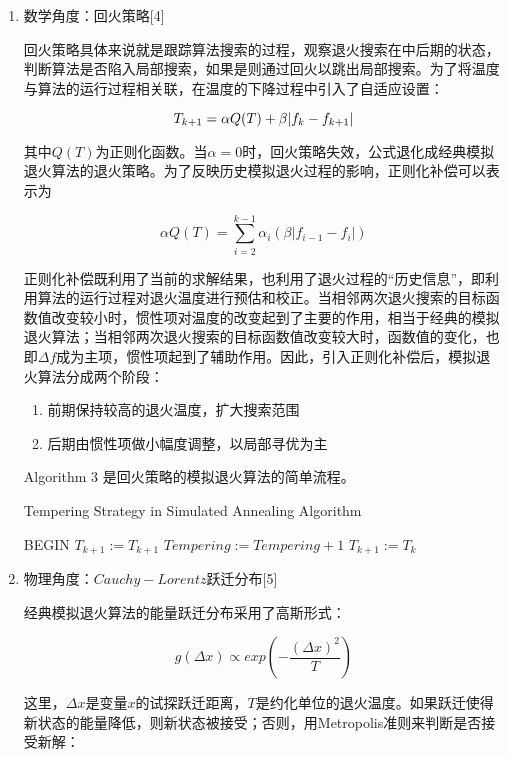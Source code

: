 \documentclass[UTF8]{ctexart}
\begin{document}
\begin{enumerate}
	\def\labelenumi{\arabic{enumi}.}
	\item
	数学角度：回火策略[4]
	
	回火策略具体来说就是跟踪算法搜索的过程，观察退火搜索在中后期的状态，判断算法是否陷入局部搜索，如果是则通过回火以跳出局部搜索。为了将温度与算法的运行过程相关联，在温度的下降过程中引入了自适应设置：
	
	\[T_{k+1}=\alpha Q(T)+\beta |f_k-f_{k+1}| \\\]
	
	其中\(Q(T)\)为正则化函数。当\(\alpha =0\)时，回火策略失效，公式退化成经典模拟退火算法的退火策略。为了反映历史模拟退火过程的影响，正则化补偿可以表示为
	
	\[\alpha Q(T)=\sum_{i=2}^{k-1} \alpha_i(\beta|f_{i-1}-f_i|)\]
	
	正则化补偿既利用了当前的求解结果，也利用了退火过程的``历史信息''，即利用算法的运行过程对退火温度进行预估和校正。当相邻两次退火搜索的目标函数值改变较小时，惯性项对温度的改变起到了主要的作用，相当于经典的模拟退火算法；当相邻两次退火搜索的目标函数值改变较大时，函数值的变化，也即\(\Delta f\)成为主项，惯性项起到了辅助作用。因此，引入正则化补偿后，模拟退火算法分成两个阶段：
	
	\begin{enumerate}
		\def\labelenumii{\arabic{enumii}.}
		\item
		前期保持较高的退火温度，扩大搜索范围
		\item
		后期由惯性项做小幅度调整，以局部寻优为主
	\end{enumerate}

	Algorithm 3 是回火策略的模拟退火算法的简单流程。
	\begin{algorithm}[t]
		\caption{Tempering Strategy in Simulated Annealing Algorithm}
		\begin{algorithmic}[1]
			\STATE BEGIN 
			\IF{$\frac{T_k}{T_{k+1}+Tempering^{\gamma }}>random[0,1)$}
			\STATE $T_{k+1}:=T_{k+1}$
			\STATE $Tempering:=Tempering+1$
			\ELSE{}
			\STATE $T_{k+1}:=T_k$
			\ENDIF
		\end{algorithmic}
	\end{algorithm}
	
	\item
	物理角度：\(Cauchy-Lorentz\)跃迁分布[5]
	
	经典模拟退火算法的能量跃迁分布采用了高斯形式：
	
	\[g(\Delta x)\propto exp(-\frac{(\Delta x)^2}{T})\]
	
	这里，\(\Delta x\)是变量\(x\)的试探跃迁距离，\(T\)是约化单位的退火温度。如果跃迁使得新状态的能量降低，则新状态被接受；否则，用Metropolis准则来判断是否接受新解：
	

\end{enumerate}
\end{document}
